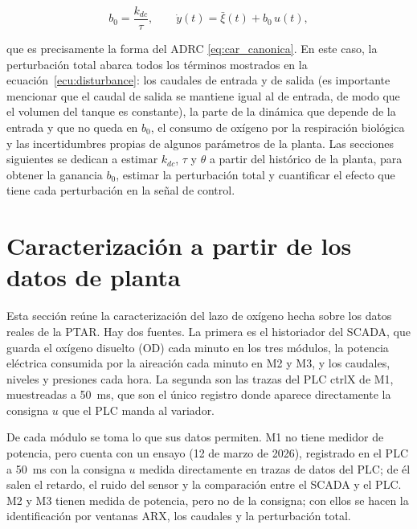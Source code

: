\begin{equation}
b_0=\frac{k_{dc}}{\tau},
\qquad
\dot{y}(t)=\bar{\xi}(t) + b_0\, u(t),
\label{eq:car_b0}
\end{equation}

que es precisamente la forma del ADRC \eqref{eq:car_canonica}. En este caso,
la perturbación total abarca todos los términos mostrados en la
ecuación~\eqref{ecu:disturbance}: los caudales de entrada y de salida (es
importante mencionar que el caudal de salida se mantiene igual al de entrada,
de modo que el volumen del tanque es constante), la parte de la dinámica que
depende de la entrada y que no queda en $b_0$, el consumo de oxígeno por la
respiración biológica y las incertidumbres propias de algunos parámetros de la
planta. Las secciones siguientes se dedican a estimar $k_{dc}$, $\tau$ y
$\theta$ a partir del histórico de la planta, para obtener la ganancia $b_0$,
estimar la perturbación total y cuantificar el efecto que tiene cada
perturbación en la señal de control.

\section{Caracterización a partir de los datos de planta}
\label{sec:ident}

Esta sección reúne la caracterización del lazo de oxígeno hecha sobre los datos
reales de la PTAR. Hay dos fuentes. La primera es el historiador del SCADA, que
guarda el oxígeno disuelto (OD) cada minuto en los tres módulos, la potencia
eléctrica consumida por la aireación cada minuto en M2 y M3, y los caudales,
niveles y presiones cada hora. La segunda son las trazas del PLC ctrlX de M1,
muestreadas a 50~ms, que son el único registro donde aparece directamente la
consigna $u$ que el PLC manda al variador.

De cada módulo se toma lo que sus datos permiten. M1 no tiene medidor de
potencia, pero cuenta con un ensayo (12 de marzo de 2026), registrado en el
PLC a 50~ms con la consigna $u$ medida directamente en trazas de datos del PLC; de él salen el retardo, el
ruido del sensor y la comparación entre el SCADA y el PLC. M2 y M3 tienen
medida de potencia, pero no de la consigna; con ellos se hacen la
identificación por ventanas ARX, los caudales y la perturbación total.

